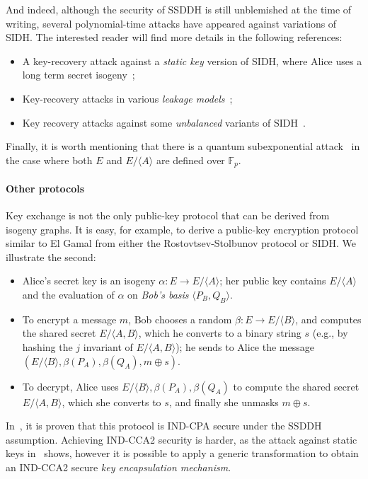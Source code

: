 \documentclass[10pt]{article}
\theoremstyle{plain}
\theoremstyle{definition}
\def\F{\ensuremath{\mathbb{F}}}
\begin{document}
And indeed, although the security of SSDDH is still unblemished at the
time of writing, several polynomial-time attacks have appeared against
variations of SIDH. %
The interested reader will find more details in the following
references:
\begin{itemize}
\item A key-recovery attack against a \emph{static key} version of
  SIDH, where Alice uses a long term secret
  isogeny~\cite{galbraithsecurity};
\item Key-recovery attacks in various \emph{leakage
    models}~\cite{galbraithsecurity,gelin2017loop,ti2017fault};
\item Key recovery attacks against some \emph{unbalanced} variants
  of SIDH~\cite{cryptoeprint:2017:571}.
\end{itemize}
Finally, it is worth mentioning that there is a quantum subexponential
attack~\cite{biasse2014quantum} in the case where both $E$ and
$E/〈A〉$ are defined over $\F_p$.


\paragraph{Other protocols}
Key exchange is not the only public-key protocol that can be derived
from isogeny graphs. %
It is easy, for example, to derive a public-key encryption protocol
similar to El Gamal from either the Rostovtsev-Stolbunov protocol or
SIDH. %
We illustrate the second:
\begin{itemize}
\item Alice's secret key is an isogeny $α:E\to E/〈A〉$; her public
  key contains $E/〈A〉$ and the evaluation of $α$ on \emph{Bob's
    basis} $〈P_B,Q_B〉$.
\item To encrypt a message $m$, Bob chooses a random $β:E\to E/〈B〉$,
  and computes the shared secret $E/〈A,B〉$, which he converts to a
  binary string $s$ (e.g., by hashing the $j$ invariant of
  $E/〈A,B〉$); he sends to Alice the message
  $(E/〈B〉,β(P_A),β(Q_A),m⊕s)$.
\item To decrypt, Alice uses $E/〈B〉,β(P_A),β(Q_A)$ to compute the
  shared secret $E/〈A,B〉$, which she converts to $s$, and finally
  she unmasks $m⊕s$.
\end{itemize}

In~\cite{defeo+jao+plut12}, it is proven that this protocol is IND-CPA
secure under the SSDDH assumption. %
Achieving IND-CCA2 security is harder, as the attack against static
keys in~\cite{galbraithsecurity} shows, however it is possible to
apply a generic transformation to obtain an IND-CCA2 secure \emph{key
  encapsulation mechanism}.
\end{document}
